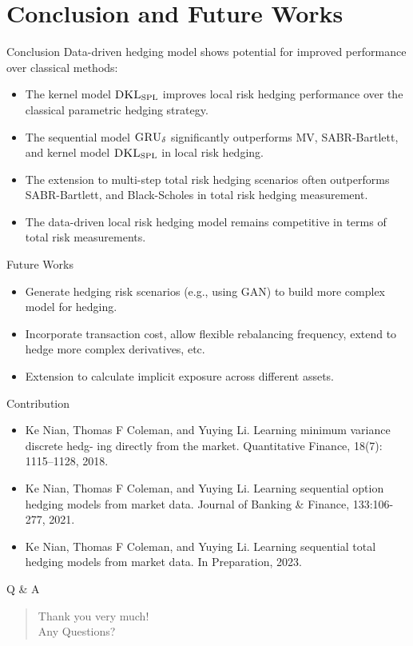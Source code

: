 \documentclass[10pt,table,mathserif]{beamer}
\newcommand{\model}{\textsc{GRU}_\delta}
\newcommand{\DKLs}{\bf\textsc{DKL}_{\text{SPL}}}
\begin{document}
\section{Conclusion and Future Works}
\begin{frame}{Conclusion}
Data-driven  hedging model shows potential for improved performance over classical methods:
\begin{itemize}
\item The kernel model $\DKLs$ improves  local risk hedging performance over the classical parametric hedging strategy.
\item The sequential model $\model$ significantly outperforms MV, SABR-Bartlett, and kernel model $\DKLs$ in local risk hedging.
\item  The  extension to multi-step total risk hedging scenarios often outperforms SABR-Bartlett, and Black-Scholes in total risk hedging measurement. 
\item The data-driven local risk hedging model remains competitive in terms of total risk measurements.
\end{itemize}
\end{frame}
\begin{frame}{Future Works}
\begin{itemize}
	\item  Generate  hedging risk scenarios (e.g., using GAN)  to build more complex model for hedging.
	\item  Incorporate transaction cost, allow flexible rebalancing frequency, extend to hedge more complex derivatives, etc.
	\item  Extension to calculate implicit exposure across different assets. 
\end{itemize}
\end{frame}

\begin{frame}{Contribution}
\begin{itemize}
\item Ke Nian, Thomas F Coleman, and Yuying Li. Learning minimum variance discrete hedg-
ing directly from the market. Quantitative Finance, 18(7): 1115–1128, 2018.
\item Ke Nian, Thomas F Coleman, and Yuying Li. Learning sequential option hedging models
from market data. Journal of Banking \& Finance, 133:106-277, 2021.
\item Ke Nian, Thomas F Coleman, and Yuying Li. Learning sequential total hedging models
from market data. In Preparation, 2023.
\end{itemize}
\end{frame}

\begin{frame}{Q \& A}
\LARGE
\begin{quote}
	\alert{Thank you very much!}\\
	\hspace{8ex} Any Questions?
\end{quote}
\end{frame}
\end{document}
